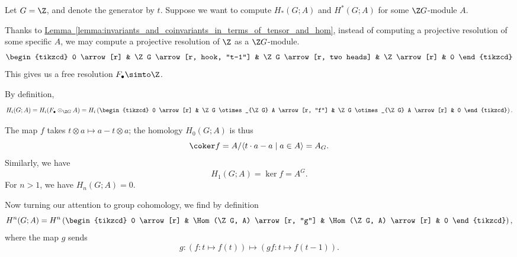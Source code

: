 \documentclass[main.tex]{subfiles}
\begin{document}
\begin{example}
  Let $G = \Z$, and denote the generator by $t$. Suppose we want to compute $H_{*}(G; A)$ and $H^{*}(G; A)$ for some $\Z G$-module $A$.

  Thanks to \hyperref[lemma:invariants_and_coinvariants_in_terms_of_tensor_and_hom]{Lemma~\ref*{lemma:invariants_and_coinvariants_in_terms_of_tensor_and_hom}}, instead of computing a projective resolution of some specific $A$, we may compute a projective resolution of $\Z$ as a $\Z G$-module.
  \begin{equation*}
    \begin{tikzcd}
      0
      \arrow[r]
      & \Z G
      \arrow[r, hook, "t-1"]
      & \Z G
      \arrow[r, two heads]
      & \Z
      \arrow[r]
      & 0
    \end{tikzcd}
  \end{equation*}
  This gives us a free resolution $F_{\bullet} \simto \Z$.

  By definition,
  \begin{equation*}
    H_{i}(G; A) = H_{i}(F_{\bullet} \otimes_{\Z G} A) = H_{i}\left(
    \begin{tikzcd}
      0
      \arrow[r]
      & \Z G \otimes_{\Z G} A
      \arrow[r, "f"]
      & \Z G \otimes_{\Z G} A
      \arrow[r]
      & 0
    \end{tikzcd}
    \right).
  \end{equation*}

  The map $f$ takes $t \otimes a \mapsto a - t \otimes a$; the homology $H_{0}(G; A)$ is thus
  \begin{equation*}
    \coker f = A/\langle t\cdot a - a \mid a \in A \rangle = A_{G}.
  \end{equation*}
  Similarly, we have
  \begin{equation*}
    H_{1}(G; A) = \ker f = A^{G}.
  \end{equation*}
  For $n > 1$, we have $H_{n}(G; A) = 0$.

  Now turning our attention to group cohomology, we find by definition
  \begin{equation*}
    H^{n}(G; A) = H^{n}\left(
    \begin{tikzcd}
      0
      \arrow[r]
      & \Hom(\Z G, A)
      \arrow[r, "g"]
      & \Hom(\Z G, A)
      \arrow[r]
      & 0
    \end{tikzcd}
    \right),
  \end{equation*}
  where the map $g$ sends
  \begin{equation*}
    g\colon \left( f\colon t \mapsto f(t) \right) \mapsto \left( gf\colon t \mapsto f(t-1) \right).
  \end{equation*}


\end{example}
\end{document}
